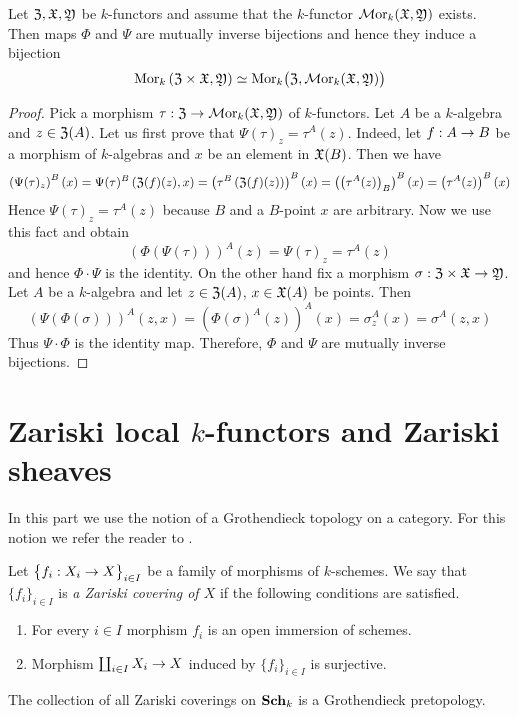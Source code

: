 \begin{theorem}\label{theorem:category_of_k_functors_is_cartesian_closed}
Let ${\mathfrak Z},{\mathfrak X},{\mathfrak Y}$ be $k$-functors and assume that the $k$-functor $\mathcal{M}\mathrm{or}_k({\mathfrak X},{\mathfrak Y})$ exists. Then maps $\Phi$ and $\Psi$ are mutually inverse bijections and hence they induce a bijection
$$\mathrm{Mor}_k\left({\mathfrak Z}\times {\mathfrak X},{\mathfrak Y}\right) \simeq  \mathrm{Mor}_k\big({\mathfrak Z},\mathcal{M}\mathrm{or}_k({\mathfrak X},{\mathfrak Y})\big)$$
\end{theorem}
\begin{proof}
Pick a morphism $\tau:{\mathfrak Z}\rightarrow \mathcal{M}\mathrm{or}_k({\mathfrak X},{\mathfrak Y})$ of $k$-functors. Let $A$ be a $k$-algebra and $z\in {\mathfrak Z}(A)$. Let us first prove that $\Psi(\tau)_z = \tau^A(z)$. Indeed, let $f:A\rightarrow B$ be a morphism of $k$-algebras and $x$ be an element in ${\mathfrak X}(B)$. Then we have
$$\left(\Psi(\tau)_z\right)^B(x) = \Psi(\tau)^B\left({\mathfrak Z}(f)(z),x\right) = \left(\tau^B\left({\mathfrak Z}(f)(z)\right)\right)^B(x) = \left(\left(\tau^A(z)\right)_B\right)^B(x) = \left(\tau^A(z)\right)^B(x)$$
Hence $\Psi(\tau)_z = \tau^A(z)$ because $B$ and a $B$-point $x$ are arbitrary. Now we use this fact and obtain
$$\left(\Phi(\Psi(\tau))\right)^A(z) = \Psi(\tau)_z = \tau^A(z)$$
and hence $\Phi\cdot \Psi$ is the identity. On the other hand fix a morphism $\sigma:{\mathfrak Z}\times {\mathfrak X} \rightarrow {\mathfrak Y}$. Let $A$ be a $k$-algebra and let $z\in {\mathfrak Z}(A)$, $x\in {\mathfrak X}(A)$ be points. Then
$$\left(\Psi\left(\Phi(\sigma)\right)\right)^A(z,x) = \left(\Phi(\sigma)^A(z)\right)^A(x) = \sigma_z^A(x) = \sigma^A(z,x)$$
Thus $\Psi\cdot \Phi$ is the identity map. Therefore, $\Phi$ and $\Psi$ are mutually inverse bijections.
\end{proof}

\section{Zariski local $k$-functors and Zariski sheaves}
\noindent
In this part we use the notion of a Grothendieck topology on a category. For this notion we refer the reader to \cite{Sheaves}.

\begin{definition}
Let $\big\{f_i:X_i\rightarrow X\big\}_{i\in I}$ be a family of morphisms of $k$-schemes. We say that $\{f_i\}_{i\in I}$ is \textit{a Zariski covering of $X$} if the following conditions are satisfied.
\begin{enumerate}[label=\textbf{(\arabic*)}, leftmargin=3.0em]
\item For every $i\in I$ morphism $f_i$ is an open immersion of schemes.
\item Morphism $\coprod_{i\in I}X_i\rightarrow X$ induced by $\big\{f_i\big\}_{i\in I}$ is surjective.
\end{enumerate}
\end{definition}
\noindent
The collection of all Zariski coverings on $\mathbf{Sch}_k$ is a Grothendieck pretopology.

